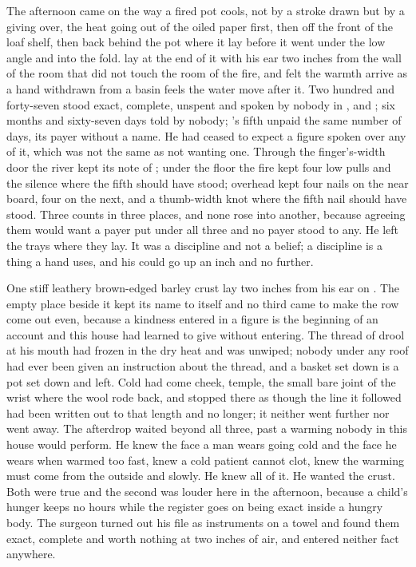 The afternoon came on the way a fired pot cools, not by a stroke drawn but by a giving over, the heat going out of the oiled paper first, then off the front of the loaf shelf, then back behind the pot where it lay before it went under the low angle and into the fold.  lay at the end of it with his ear two inches from the wall of the room that did not touch the room of the fire, and felt the warmth arrive as a hand withdrawn from a basin feels the water move after it. Two hundred and forty-seven stood exact, complete, unspent and spoken by nobody in ,  and ; six months and sixty-seven days told by nobody; 's fifth unpaid the same number of days, its payer without a name. He had ceased to expect a figure spoken over any of it, which was not the same as not wanting one. Through the finger's-width door the river kept its note of ; under the floor the fire kept four low pulls and the silence where the fifth should have stood; overhead  kept four nails on the near board, four on the next, and a thumb-width knot where the fifth nail should have stood. Three counts in three places, and none rose into another, because agreeing them would want a payer put under all three and no payer stood to any. He left the trays where they lay. It was a discipline and not a belief; a discipline is a thing a hand uses, and his could go up an inch and no further.

One stiff leathery brown-edged barley crust lay two inches from his ear on . The empty place beside it kept its name to itself and no third came to make the row come out even, because a kindness entered in a figure is the beginning of an account and this house had learned to give without entering. The thread of drool at his mouth had frozen in the dry heat and was unwiped; nobody under any roof had ever been given an instruction about the thread, and a basket set down is a pot set down and left. Cold had come cheek, temple, the small bare joint of the wrist where the wool rode back, and stopped there as though the line it followed had been written out to that length and no longer; it neither went further nor went away. The afterdrop waited beyond all three, past a warming nobody in this house would perform. He knew the face a man wears going cold and the face he wears when warmed too fast, knew a cold patient cannot clot, knew the warming must come from the outside and slowly. He knew all of it. He wanted the crust. Both were true and the second was louder here in the afternoon, because a child's hunger keeps no hours while the register goes on being exact inside a hungry body. The surgeon turned out his file as instruments on a towel and found them exact, complete and worth nothing at two inches of air, and entered neither fact anywhere.

